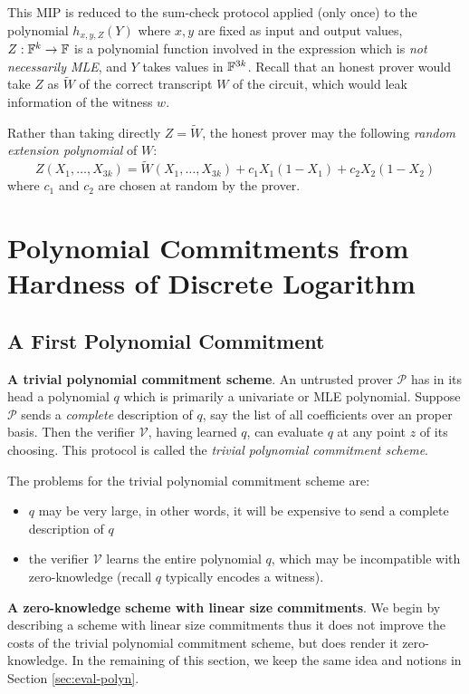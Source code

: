 \documentclass{article}
\begin{document}
This MIP is reduced to the sum-check protocol applied (only once) to the polynomial $h_{x, y, Z}(Y)$ where $x, y$ are fixed as input and output values, $Z: \mathbb{F}^k \rightarrow \mathbb{F}$ is a polynomial function involved in the expression which is \textit{not necessarily MLE}, and $Y$ takes values in $\mathbb{F}^{3k}$. Recall that an honest prover would take $Z$ as $\widetilde{W}$ of the correct transcript $W$ of the circuit, which would leak information of the witness $w$. 

Rather than taking directly $Z = \widetilde{W}$, the honest prover may the following \textit{random extension polynomial} of $W$:
\begin{equation*}
Z(X_1, \dots, X_{3k}) = \widetilde{W}(X_1, \dots, X_{3k}) + c_1X_1(1 - X_1) + c_2X_2(1 - X_2)
\end{equation*}
where $c_1$ and $c_2$ are chosen at random by the prover. 

\section{Polynomial Commitments from Hardness of Discrete Logarithm}

\subsection{A First Polynomial Commitment}

\textbf{A trivial polynomial commitment scheme}. An untrusted prover $\mathcal{P}$ has in its head a polynomial $q$ which is primarily a univariate or MLE polynomial. Suppose $\mathcal{P}$ sends a \textit{complete} description of $q$, say the list of all coefficients over an proper basis. Then the verifier $\mathcal{V}$, having learned $q$, can evaluate $q$ at any point $z$ of its choosing. This protocol is called the \textit{trivial polynomial commitment scheme}. 

The problems for the trivial polynomial commitment scheme are: 
\begin{itemize}
\item $q$ may be very large, in other words, it will be expensive to send a complete description of $q$ 
\item the verifier $\mathcal{V}$ learns the entire polynomial $q$, which may be incompatible with zero-knowledge (recall $q$ typically encodes a witness). 
\end{itemize}

\textbf{A zero-knowledge scheme with linear size commitments}. We begin by describing a scheme with linear size commitments thus it does not improve the costs of the trivial polynomial commitment scheme, but does render it zero-knowledge. In the remaining of this section, we keep the same idea and notions in Section \ref{sec:eval-polyn}.
\end{document}
